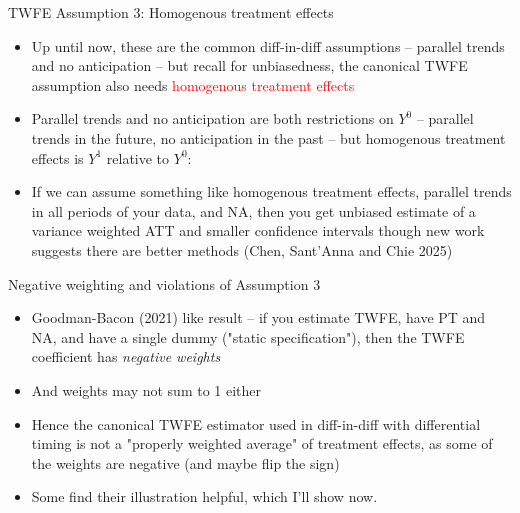 \documentclass{beamer}
\begin{document}
\begin{frame}{TWFE Assumption 3: Homogenous treatment effects}

\begin{itemize}
\item Up until now, these are the common diff-in-diff assumptions -- parallel trends and no anticipation -- but recall for unbiasedness, the canonical TWFE assumption also needs \textcolor{red}{homogenous treatment effects}
\item  Parallel trends and no anticipation are both restrictions on $Y^0$ -- parallel trends in the future, no anticipation in the past -- but homogenous treatment effects is $Y^1$ relative to $Y^0$:
\item  If we can assume something like homogenous treatment effects, parallel trends in all periods of your data, and NA, then you get unbiased estimate of a variance weighted ATT and smaller confidence intervals though new work suggests there are better methods (Chen, Sant'Anna and Chie 2025)
\end{itemize}

\end{frame}



\begin{frame}{Negative weighting and violations of Assumption 3}


\begin{itemize}
\item Goodman-Bacon (2021) like result -- if you estimate TWFE, have PT and NA, and have a single dummy ("static specification"), then the TWFE coefficient has \emph{negative weights}
\item And weights may not sum to 1 either
\item Hence the canonical TWFE estimator used in diff-in-diff with differential timing is not a "properly weighted average" of treatment effects, as some of the weights are negative (and maybe flip the sign)
\item Some find their illustration helpful, which I'll show now.
\end{itemize}

\end{frame}
\end{document}
